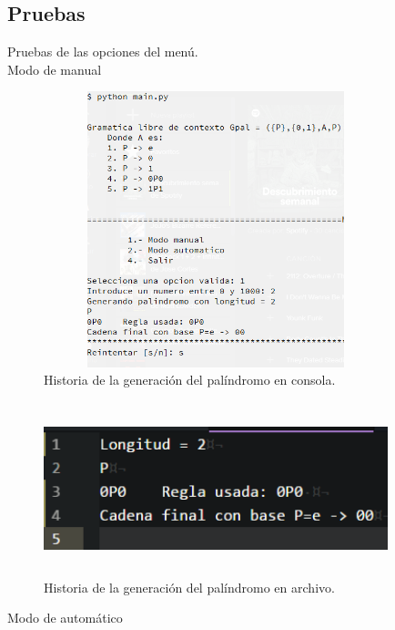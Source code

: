 	\subsection{Pruebas}
	Pruebas de las opciones del menú.
	\\
	{\large Modo de manual}
	\begin{figure}[H]
		\begin{center}
			\includegraphics[width=10cm, height=8cm]{img/palindromo-manual-consola.png}
			\caption{Historia de la generación del palíndromo en consola.}
			\label{fig:palindromo1}
		\end{center}
	\end{figure}
	\begin{figure}[H]
		\begin{center}
			\includegraphics[width=10cm, height=5cm]{img/palindromo-manual-archivo.png}
			\caption{Historia de la generación del palíndromo en archivo.}
			\label{fig:palindromo2}
		\end{center}
	\end{figure}
	\newpage
	{\large Modo de automático}
